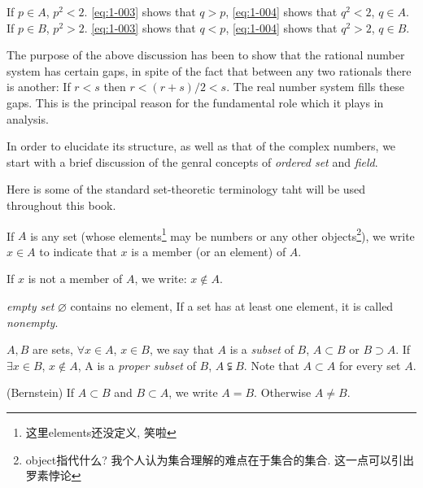 If $p\in A$, $p^2<2$. \ref{eq:1-003} shows that $q>p$, \ref{eq:1-004} shows that $q^2<2$, $q\in A$.
If $p\in B$, $p^2>2$. \ref{eq:1-003} shows that $q<p$, \ref{eq:1-004} shows that $q^2>2$, $q\in B$.


\begin{myRemark}\label{Remark:1.2}
The purpose of the above discussion has been to show that the rational number system has certain gaps, 
in spite of the fact that between any two rationals there is another: If $r<s$ then $r<(r+s)/2<s$.
The real number system fills these gaps.
This is the principal reason for the fundamental role which it plays in analysis.
\end{myRemark}


In order to elucidate its structure, as well as that of the complex numbers, 
we start with a brief discussion of the genral concepts of \emph{ordered set} and \emph{field}.



Here is some of the standard set-theoretic terminology taht will be used throughout this book.


\begin{myDefinition}\label{myDefinitions:1.3}
If $A$ is any set (whose elements\footnote{这里elements还没定义, 笑啦} may be numbers or any other objects\footnote{object指代什么? 我个人认为集合理解的难点在于集合的集合. 这一点可以引出罗素悖论}), we write $x\in A$ to indicate that $x$ is a member (or an element) of $A$.

If $x$ is not a member of $A$, we write: $x\notin A$.

\emph{empty set} $\varnothing$ contains no element, If a set has at least one element, it is called \emph{nonempty}.

$A,B$ are sets, $\forall x\in A$, $x\in B$, we say that $A$ is a \emph{subset} of $B$, $A\subset B$ or $B\supset A$. If $\exists x\in B$, $x\notin A$, A is a \emph{proper subset} of $B$, $A \subsetneqq B$.
Note that $A\subset A$ for every set $A$.

(Bernstein) If $A\subset B$ and $B\subset A$, we write $A = B$. Otherwise $A\neq B$.
\end{myDefinition}

